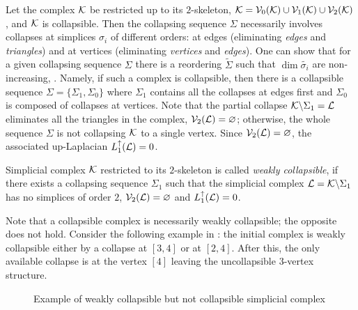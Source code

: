 Let the complex \( \mathcal{K} \) be restricted up to its \(2\)-skeleton, \( \mathcal{K} = \mathcal{V}_{0}(\mathcal{K}) \cup \mathcal{V}_{1}(\mathcal{K}) \cup \mathcal{V}_{2}(\mathcal{K}) \), and \( \mathcal{K} \) is collapsible. Then the collapsing sequence \( \Sigma \) necessarily involves collapses at simplices \( \sigma_i \) of different orders: at edges (eliminating \emph{edges} and \emph{triangles}) and at vertices (eliminating \emph{vertices} and \emph{edges}). One can show that for a given collapsing sequence \( \Sigma \) there is a reordering \( \tilde \Sigma \) such that \( \dim \tilde{\sigma_i} \) are non-increasing, {\cite[Lemma 2.5]{cohenSolving1laplaciansNearly2014}}. Namely, if such a complex is collapsible, then there is a collapsible sequence \( \Sigma = \{ \Sigma_1, \Sigma_0 \} \) where \( \Sigma_1 \) contains all the collapses at edges first and \( \Sigma_0 \) is composed of collapses at vertices. Note that the partial collapse \( \mathcal{K} \backslash \Sigma_1 = \mathcal{L} \) eliminates all the triangles in the complex, \( \mathcal{V}_2 (\mathcal{L}) = \varnothing \); otherwise, the whole sequence \( \Sigma \) is not collapsing \( \mathcal{K} \) to a single vertex. Since \( \mathcal{V}_2 (\mathcal{L} ) = \varnothing \), the associated up-Laplacian \( L_{1}^{\uparrow} ( \mathcal{L} ) = 0 \).

\begin{definition}
      Simplicial complex \( \mathcal{K} \) restricted to its \(2\)-skeleton is called \emph{weakly collapsible}, if there exists a collapsing sequence \( \Sigma_1 \) such that the simplicial complex \( \mathcal{L} = \mathcal{K} \backslash \Sigma_1 \) has no simplices of order \(2\), \( \mathcal{V}_2(\mathcal{L}) = \varnothing \) and \( L_{1}^{\uparrow} (\mathcal{L} ) = 0 \).
\end{definition}

\begin{example}
      Note that a collapsible complex is necessarily weakly collapsible; the opposite does not hold. Consider the following example in : the initial complex is weakly collapsible either by a collapse at \( [3, 4] \) or at \( [2, 4] \). After this, the only available collapse is at the vertex \([4]\) leaving the uncollapsible \(3\)-vertex structure.

      \begin{figure}[hbtp]
            \centering
            
            \caption{Example of weakly collapsible but not collapsible simplicial complex \label{fig:weak_example}}
      \end{figure}
\end{example}

